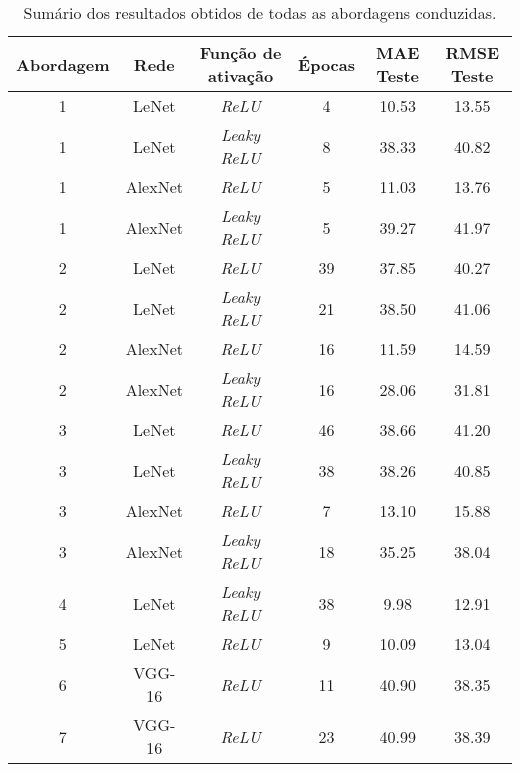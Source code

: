 \begin{table}[!ht]
	\caption{Sumário dos resultados obtidos de todas as abordagens conduzidas.}
	\label{tab:resultsAll}
  \begin{center}
		\begin{tabular}{cccccc}
			\toprule
			Abordagem & Rede & Função de ativação & Épocas & MAE Teste & RMSE Teste \\
			\midrule
			1 & LeNet & \emph{ReLU}  & 4 & 10.53 & 13.55 \\
			1 & LeNet & \emph{Leaky ReLU} & 8 & 38.33 & 40.82 \\
			1 & AlexNet & \emph{ReLU}  & 5 & 11.03 & 13.76 \\
			1 & AlexNet & \emph{Leaky ReLU} & 5 & 39.27 & 41.97 \\
			2 & LeNet & \emph{ReLU}  & 39 & 37.85 & 40.27 \\
			2 & LeNet & \emph{Leaky ReLU} & 21 & 38.50 & 41.06 \\
			2 & AlexNet & \emph{ReLU}  & 16 & 11.59 & 14.59 \\
			2 & AlexNet & \emph{Leaky ReLU} & 16 & 28.06 & 31.81 \\
			3 & LeNet & \emph{ReLU} & 46 &  38.66 & 41.20 \\
			3 & LeNet & \emph{Leaky ReLU} &  38 & 38.26 & 40.85 \\
			3 & AlexNet & \emph{ReLU} & 7 & 13.10 & 15.88 \\
			3 & AlexNet & \emph{Leaky ReLU} & 18 & 35.25 & 38.04 \\
			4 &	LeNet & \emph{Leaky ReLU} & 38 & 9.98 & 12.91 \\
			5 & LeNet & \emph{ReLU} & 9 &  10.09 & 13.04 \\
			6 & VGG-16 & \emph{ReLU} & 11 & 40.90 & 38.35 \\
			7 & VGG-16 & \emph{ReLU} & 23 & 40.99 & 38.39 \\
			\bottomrule
		\end{tabular}
  \end{center}
\end{table}
